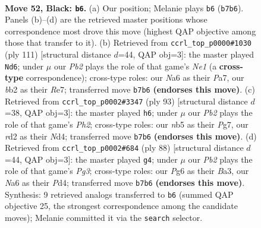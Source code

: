 \documentclass[11pt]{article}
\begin{document}
\clearpage

\begin{figure}[p]\centering
\begin{subfigure}{0.46\textwidth}\centering
\resizebox{\linewidth}{!}{%
\newchessgame
\chessboard[
  setfen={8/1p2p1k1/n1r3pp/pN6/P1p2K2/2P2P2/1B1R4/8 b - - 10 52},
  showmover=false,
  pgfstyle=straightmove, color=movearrow, markmove={b7-b6}
]}
\caption{}
\end{subfigure}\hfill
\begin{subfigure}{0.46\textwidth}\centering
\resizebox{\linewidth}{!}{%
\newchessgame
\chessboard[
  setfen={4n3/p3rpk1/6pp/8/P1R2PPP/5B2/5K2/8 b - - 16 56},
  showmover=false,
  pgfstyle=straightmove, color=movearrow, markmove={e8-d6}
]}
\caption{}
\end{subfigure}
\\[4pt]
\begin{subfigure}{0.46\textwidth}\centering
\resizebox{\linewidth}{!}{%
\newchessgame
\chessboard[
  setfen={8/3r1kpp/4pp2/8/3n1PPP/4N3/R4PK1/8 b - - 0 47},
  showmover=false,
  pgfstyle=straightmove, color=movearrow, markmove={h7-h6}
]}
\caption{}
\end{subfigure}\hfill
\begin{subfigure}{0.46\textwidth}\centering
\resizebox{\linewidth}{!}{%
\newchessgame
\chessboard[
  setfen={3r2k1/5pp1/7p/3pPb2/3P4/B3RPP1/6K1/8 w - - 4 45},
  showmover=false,
  pgfstyle=straightmove, color=movearrow, markmove={g3-g4}
]}
\caption{}
\end{subfigure}
\caption{\textbf{Move 52, Black: \texttt{b6}.} (a) Our position; Melanie plays \texttt{b6} (\texttt{b7b6}). Panels (b)--(d) are the retrieved master positions whose correspondence most drove this move (highest QAP objective among those that transfer to it). (b) Retrieved from \texttt{ccrl\_top\_p0000\#1030} (ply 111) [structural distance $d$=44, QAP obj=3]: the master played \texttt{Nd6}; under $\mu$ our \emph{Pb2} plays the role of that game's \emph{Ne1} (a \textbf{cross-type} correspondence); cross-type roles: our \emph{N}a6 as their \emph{P}a7, our \emph{b}b2 as their \emph{R}e7; transferred move \texttt{b7b6} \textbf{(endorses this move)}. (c) Retrieved from \texttt{ccrl\_top\_p0002\#3347} (ply 93) [structural distance $d$=38, QAP obj=3]: the master played \texttt{h6}; under $\mu$ our \emph{Pb2} plays the role of that game's \emph{Ph2}; cross-type roles: our \emph{n}b5 as their \emph{P}g7, our \emph{r}d2 as their \emph{N}d4; transferred move \texttt{b7b6} \textbf{(endorses this move)}. (d) Retrieved from \texttt{ccrl\_top\_p0002\#684} (ply 88) [structural distance $d$=44, QAP obj=3]: the master played \texttt{g4}; under $\mu$ our \emph{Pb2} plays the role of that game's \emph{Pg3}; cross-type roles: our \emph{P}g6 as their \emph{B}a3, our \emph{N}a6 as their \emph{P}d4; transferred move \texttt{b7b6} \textbf{(endorses this move)}. Synthesis: 9 retrieved analogs transferred to \texttt{b6} (summed QAP objective 25, the strongest correspondence among the candidate moves); Melanie committed it via the \texttt{search} selector.}
\label{fig:thought-m103}
\end{figure}
\end{document}

